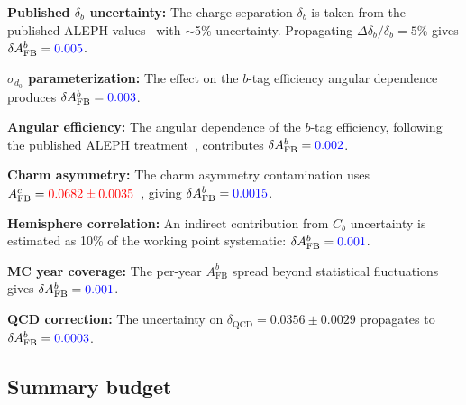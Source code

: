 \documentclass[11pt,a4paper]{article}
\newcommand{\measured}[1]{\textcolor{blue}{#1}}
\newcommand{\external}[1]{\textcolor{red}{#1}}
\begin{document}
\textbf{Published $\delta_b$ uncertainty:}
The charge separation $\delta_b$ is taken from the published ALEPH
values~\cite{LEP:EWWG:2005} with $\sim$5\% uncertainty.  Propagating
$\Delta\delta_b / \delta_b = 5\%$ gives
$\delta A_\mathrm{FB}^b = \measured{0.005}$.

\textbf{$\sigma_{d_0}$ parameterization:}
The effect on the $b$-tag efficiency angular dependence produces
$\delta A_\mathrm{FB}^b = \measured{0.003}$.

\textbf{Angular efficiency:}
The angular dependence of the $b$-tag efficiency, following the published
ALEPH treatment~\cite{LEP:EWWG:2005}, contributes
$\delta A_\mathrm{FB}^b = \measured{0.002}$.

\textbf{Charm asymmetry:}
The charm asymmetry contamination uses
$A_\mathrm{FB}^c = \external{0.0682 \pm 0.0035}$~\cite{LEP:EWWG:2005},
giving $\delta A_\mathrm{FB}^b = \measured{0.0015}$.

\textbf{Hemisphere correlation:}
An indirect contribution from $C_b$ uncertainty is estimated as 10\% of
the working point systematic:
$\delta A_\mathrm{FB}^b = \measured{0.001}$.

\textbf{MC year coverage:}
The per-year $A_\mathrm{FB}^b$ spread beyond statistical fluctuations
gives $\delta A_\mathrm{FB}^b = \measured{0.001}$.

\textbf{QCD correction:}
The uncertainty on $\delta_\mathrm{QCD} = 0.0356 \pm 0.0029$ propagates
to $\delta A_\mathrm{FB}^b = \measured{0.0003}$.

\subsection{Summary budget}
\end{document}
